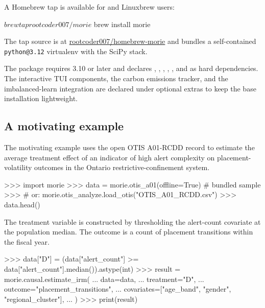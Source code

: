 \documentclass[article,shortnames,nojss]{jss}
\newcommand{\OTIS}{\textsf{OTIS}}
\begin{document}

\noindent A Homebrew tap is available for  and
Linuxbrew users:

\begin{Code}
$ brew tap rootcoder007/morie
$ brew install morie
\end{Code}

\noindent The tap source is at
\href{https://github.com/rootcoder007/homebrew-morie}{rootcoder007/homebrew-morie}
and bundles a self-contained \texttt{python@3.12} virtualenv with the
SciPy stack.

\noindent The package requires  3.10 or later
and declares , , ,
, , and  as
hard dependencies. The interactive TUI components, the carbon
emissions tracker, and the imbalanced-learn integration are
declared under optional extras to keep the base installation
lightweight.

\subsection{A motivating example}

The motivating example uses the open \OTIS{} A01-RCDD record to
estimate the average treatment effect of an indicator of high
alert complexity on placement-volatility outcomes in the Ontario
restrictive-confinement system.

\begin{Code}
>>> import morie
>>> data = morie.otis_a01(offline=True)        # bundled sample
>>> # or: morie.otis_analyze.load_otis("OTIS_A01_RCDD.csv")
>>> data.head()
\end{Code}

\noindent The treatment variable is constructed by thresholding
the alert-count covariate at the population median. The outcome is
a count of placement transitions within the fiscal year.

\begin{Code}
>>> data["D"] = (data["alert_count"] >= data["alert_count"].median()).astype(int)
>>> result = morie.causal.estimate_irm(
...     data=data,
...     treatment="D",
...     outcome="placement_transitions",
...     covariates=["age_band", "gender", "regional_cluster"],
... )
>>> print(result)
\end{Code}
\end{document}
